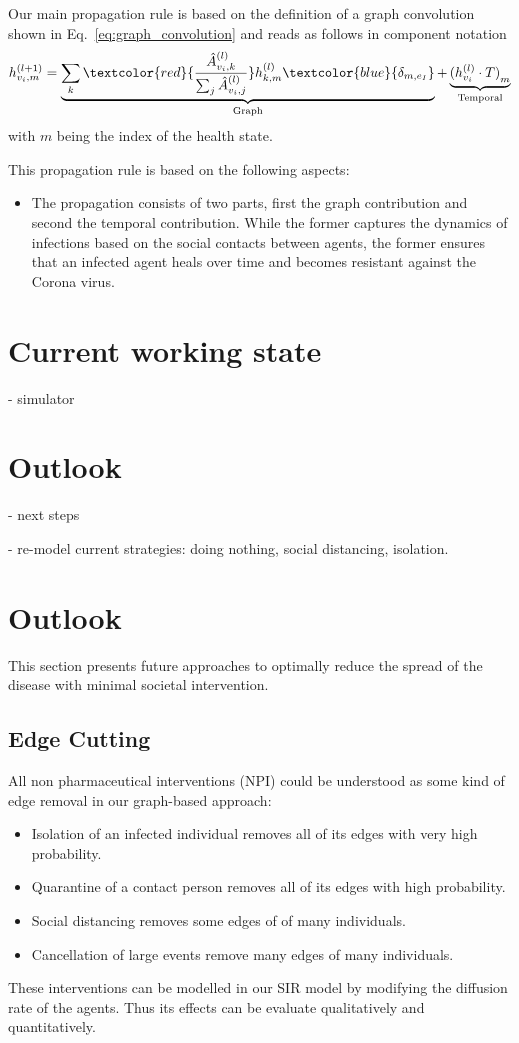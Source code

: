 \documentclass[%
 reprint,
 amsmath,amssymb,showkeys,
 aps,
]{revtex4-1}
\begin{document}
Our main propagation rule is based on the definition of a graph convolution shown in Eq.~\eqref{eq:graph_convolution} and reads as follows in component notation
\begin{equation}
h_{v_i, m}^{(l+1)}
=
\underbrace{
	\sum_k \textcolor{red}{\frac{\hat{A}_{v_i, k}^{(l)}}{\sum_j \hat{A}_{v_i, j}^{(l)}}} h_{k, m}^{(l)} \textcolor{blue}{\delta_{m, e_I}}
}_{\text{Graph}}
+
\underbrace{
	{(h_{v_i}^{(l)}\cdot T)}_m
}_{\text{Temporal}}
\end{equation}
with $m$ being the index of the health state.

This propagation rule is based on the following aspects:

\begin{itemize}
	\item The propagation consists of two parts, first the graph contribution and second the temporal contribution. While the former captures the dynamics of infections based on the social contacts between agents, the former ensures that an infected agent heals over time and becomes resistant against the Corona virus.
\end{itemize}

\section{\label{sec:working_state}Current working state}

- simulator

\section{\label{sec:outlook}Outlook}

- next steps

- re-model current strategies: doing nothing, social distancing, isolation.

\section{Outlook}
This section presents future approaches to optimally reduce the spread of the disease with minimal societal intervention.

\subsection{Edge Cutting}
All non pharmaceutical interventions (NPI) could be understood as some kind of edge removal in our graph-based approach:
\begin{itemize}
	\item Isolation of an infected individual removes all of its edges with very high probability.
	\item Quarantine of a contact person removes all of its edges with high probability.
	\item Social distancing removes some edges of of many individuals.
	\item Cancellation of large events remove many edges of many individuals.
\end{itemize}
These interventions can be modelled in our SIR model by modifying the diffusion rate of the agents.
Thus its effects can be evaluate qualitatively and quantitatively.
\end{document}
